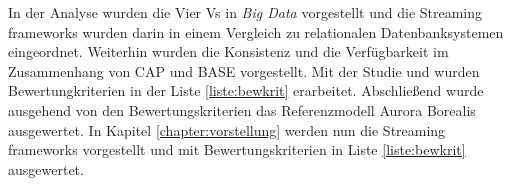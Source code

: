 In der Analyse wurden die Vier Vs in \textit{Big Data} vorgestellt und die Streaming frameworks wurden darin in einem Vergleich zu relationalen Datenbanksystemen eingeordnet. Weiterhin wurden die Konsistenz und die Verfügbarkeit im Zusammenhang von CAP und BASE vorgestellt. Mit der Studie  und  wurden Bewertungkriterien in der Liste \ref{liste:bewkrit} erarbeitet. Abschließend wurde ausgehend von den Bewertungskriterien das Referenzmodell Aurora Borealis ausgewertet. In Kapitel \ref{chapter:vorstellung} werden nun die Streaming frameworks vorgestellt und mit Bewertungskriterien in Liste \ref{liste:bewkrit} ausgewertet.